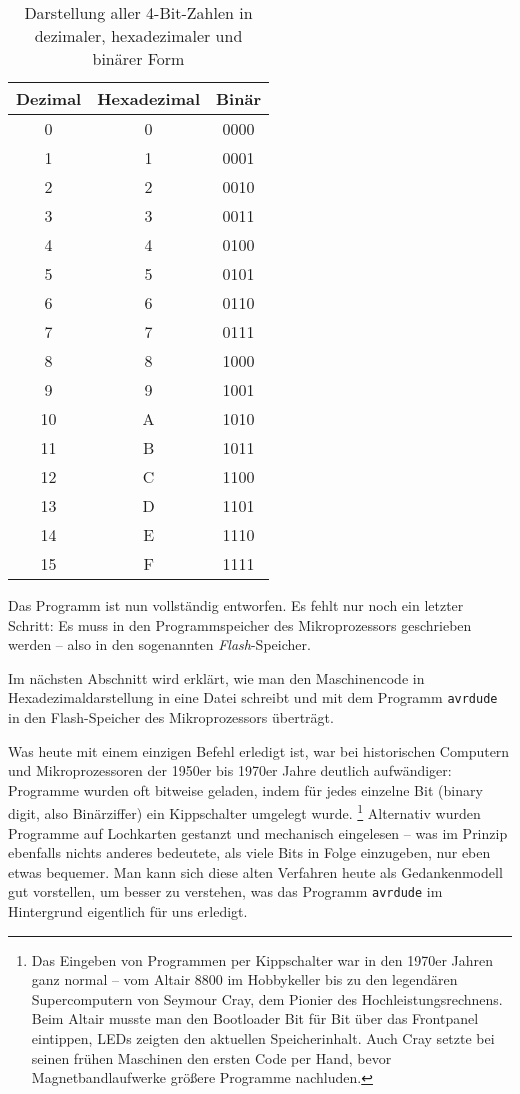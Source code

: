 \documentclass[a4paper,12pt]{article}
\begin{document}
\begin{table}[ht]
    \centering
    \caption{Darstellung aller 4-Bit-Zahlen in dezimaler, hexadezimaler und binärer Form}
    \label{tab:bitmuster}
    \begin{tabular}{c c c}
        \textbf{Dezimal} & \textbf{Hexadezimal} & \textbf{Binär} \\
        \hline
         0 & 0  & 0000 \\
         1 & 1  & 0001 \\
         2 & 2  & 0010 \\
         3 & 3  & 0011 \\
         4 & 4  & 0100 \\
         5 & 5  & 0101 \\
         6 & 6  & 0110 \\
         7 & 7  & 0111 \\
         8 & 8  & 1000 \\
         9 & 9  & 1001 \\
        10 & A  & 1010 \\
        11 & B  & 1011 \\
        12 & C  & 1100 \\
        13 & D  & 1101 \\
        14 & E  & 1110 \\
        15 & F  & 1111 \\
    \end{tabular}
\end{table}

\noindent
Das Programm ist nun vollständig entworfen. Es fehlt nur noch ein letzter
Schritt: Es muss in den Programmspeicher des Mikroprozessors geschrieben werden
– also in den sogenannten \emph{Flash}-Speicher.

\noindent
Im nächsten Abschnitt wird erklärt, wie man den Maschinencode in
Hexadezimaldarstellung in eine Datei schreibt und mit dem Programm
\texttt{avrdude} in den Flash-Speicher des Mikroprozessors überträgt.

Was heute mit einem einzigen Befehl erledigt ist, war bei historischen
Computern und Mikroprozessoren der 1950er bis 1970er Jahre deutlich
aufwändiger:
Programme wurden oft bitweise geladen, indem für jedes einzelne Bit (binary
digit, also Binärziffer) ein Kippschalter umgelegt wurde.
\footnote{Das Eingeben von Programmen per Kippschalter war in den 1970er Jahren
ganz normal – vom Altair 8800 im Hobbykeller bis zu den legendären
Supercomputern von Seymour Cray, dem Pionier des Hochleistungsrechnens. Beim
Altair musste man den Bootloader Bit für Bit über das Frontpanel eintippen,
LEDs zeigten den aktuellen Speicherinhalt. Auch Cray setzte bei seinen frühen
Maschinen den ersten Code per Hand, bevor Magnetbandlaufwerke größere Programme
nachluden.}
Alternativ wurden Programme auf Lochkarten gestanzt und mechanisch eingelesen –
was im Prinzip ebenfalls nichts anderes bedeutete, als viele Bits in Folge
einzugeben, nur eben etwas bequemer.
Man kann sich diese alten Verfahren heute als Gedankenmodell gut vorstellen, um
besser zu verstehen, was das Programm \texttt{avrdude} im Hintergrund
eigentlich für uns erledigt.
\end{document}

